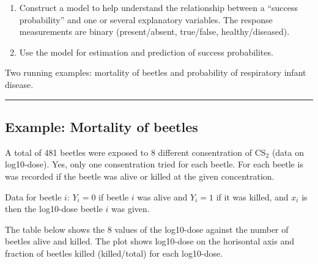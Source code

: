 \documentclass[
]{article}
\newenvironment{Shaded}{\begin{snugshade}}{\end{snugshade}}
\newcommand{\CommentTok}[1]{\textcolor[rgb]{0.56,0.35,0.01}{\textit{#1}}}
\newcommand{\ConstantTok}[1]{\textcolor[rgb]{0.56,0.35,0.01}{#1}}
\newcommand{\ControlFlowTok}[1]{\textcolor[rgb]{0.13,0.29,0.53}{\textbf{#1}}}
\newcommand{\DecValTok}[1]{\textcolor[rgb]{0.00,0.00,0.81}{#1}}
\newcommand{\FunctionTok}[1]{\textcolor[rgb]{0.13,0.29,0.53}{\textbf{#1}}}
\newcommand{\NormalTok}[1]{#1}
\newcommand{\OtherTok}[1]{\textcolor[rgb]{0.56,0.35,0.01}{#1}}
\newcommand{\SpecialCharTok}[1]{\textcolor[rgb]{0.81,0.36,0.00}{\textbf{#1}}}
\newcommand{\StringTok}[1]{\textcolor[rgb]{0.31,0.60,0.02}{#1}}
\providecommand{\tightlist}{%
  \setlength{\itemsep}{0pt}\setlength{\parskip}{0pt}}
\begin{document}
\begin{enumerate}
\def\labelenumi{\arabic{enumi}.}
\tightlist
\item
  Construct a model to help understand the relationship between a
  ``success probability'' and one or several explanatory variables. The
  response measurements are binary (present/absent, true/false,
  healthy/diseased).
\item
  Use the model for estimation and prediction of success probabilites.
\end{enumerate}

Two running examples: mortality of beetles and probability of
respiratory infant disease.

\begin{center}\rule{0.5\linewidth}{0.5pt}\end{center}

\hypertarget{example-mortality-of-beetles}{%
\subsection{Example: Mortality of
beetles}\label{example-mortality-of-beetles}}

A total of 481 beetles were exposed to 8 different consentration of
CS\(_2\) (data on log10-dose). Yes, only one consentration tried for
each beetle. For each beetle is was recorded if the beetle was alive or
killed at the given concentration.

Data for beetle \(i\): \(Y_i=0\) if beetle \(i\) was alive and \(Y_i=1\)
if it was killed, and \(x_i\) is then the log10-dose beetle \(i\) was
given.

The table below shows the 8 values of the log10-dose against the number
of beetles alive and killed. The plot shows log10-dose on the horisontal
axis and fraction of beetles killed (killed/total) for each log10-dose.

\begin{Shaded}
\end{Shaded}
\end{document}
